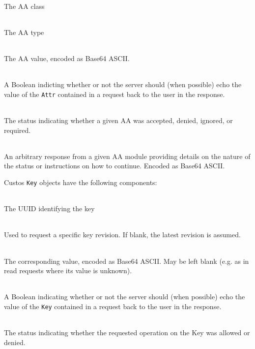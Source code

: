 \begin{packed_desc}
\item[\texttt{Class}] \hfill \\ The AA class
\item[\texttt{Type}] \hfill \\ The AA type
\item[\texttt{Value}] \hfill \\ The AA value, encoded as Base64 ASCII.
\item[\texttt{Echo}] \hfill \\ A Boolean indicting whether or not the
  server should (when possible) echo the value of the \texttt{Attr}
  contained in a request back to the user in the response.
\item[\texttt{Status} (Response Only)] \hfill \\ The status indicating
  whether a given AA was accepted, denied, ignored, or required.
\item[\texttt{ResValue} (Response Only)] \hfill \\ An arbitrary
  response from a given AA module providing details on the nature of
  the status or instructions on how to continue. Encoded as Base64
  ASCII.
\end{packed_desc}

\noindent
Custos \texttt{Key} objects have the following components:

\begin{packed_desc}
\item[\texttt{UUID}] \hfill \\ The UUID identifying the key
\item[\texttt{Revision}] \hfill \\ Used to request a specific key
  revision. If blank, the latest revision is assumed.
\item[\texttt{Value}] \hfill \\ The corresponding value, encoded as
  Base64 ASCII. May be left blank (e.g. as in read requests where its
  value is unknown).
\item[\texttt{Echo}] \hfill \\ A Boolean indicating whether or not the
  server should (when possible) echo the value of the \texttt{Key}
  contained in a request back to the user in the response.
\item[\texttt{Status} (Response Only)] \hfill \\ The status indicating
  whether the requested operation on the Key was allowed or denied.
\end{packed_desc}

